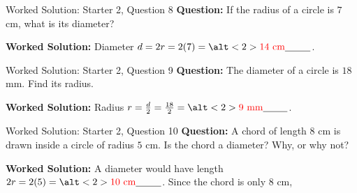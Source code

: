 \documentclass{beamer}
\newcommand{\ablank}[1]{%
  \alt<2>{\textcolor{red}{#1}}{\underline{\phantom{#1}}}%
}
\newcommand{\ashow}[1]{\uncover<2->{\textcolor{red}{\small #1}}}
\begin{document}
\begin{frame}{Worked Solution: Starter 2, Question 8}
\small
\textbf{Question:} If the radius of a circle is \(7\) cm, what is its diameter?

\textbf{Worked Solution:} Diameter \(d=2r=2(7)=\ablank{14\text{ cm}}\).
\end{frame}

\begin{frame}{Worked Solution: Starter 2, Question 9}
\small
\textbf{Question:} The diameter of a circle is \(18\) mm. Find its radius.

\textbf{Worked Solution:} Radius \(r=\frac{d}{2}=\frac{18}{2}=\ablank{9\text{ mm}}\).
\end{frame}

\begin{frame}{Worked Solution: Starter 2, Question 10}
\small
\textbf{Question:} A chord of length \(8\) cm is drawn inside a circle of radius \(5\) cm. Is the chord a diameter? Why, or why not?

\textbf{Worked Solution:} A diameter would have length \(2r=2(5)=\ablank{10\text{ cm}}\). Since the chord is only \(8\) cm, \ashow{it is not a diameter; a diameter would be \(10\) cm.}
\end{frame}
\end{document}
